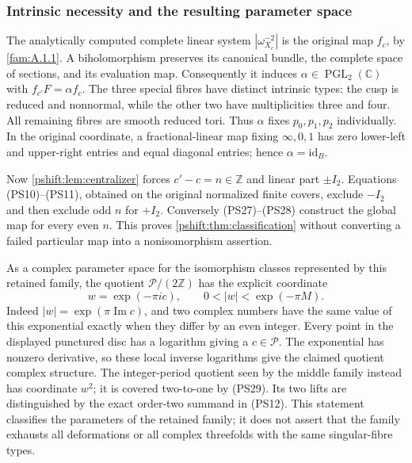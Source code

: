 \subsubsection{Intrinsic necessity and the resulting parameter space}

The analytically computed complete linear system
$|\omega_{X_c}^{-2}|$ is the original map $f_c$, by
\cref{fam:A.1.1}. A biholomorphism preserves its
canonical bundle, the complete space of sections, and its evaluation
map. Consequently it induces $\alpha\in\operatorname{PGL}_2(\mathbb C)$
with $f_{c'}F=\alpha f_c$. The three special fibres have distinct
intrinsic types: the cusp is reduced and nonnormal, while the other
two have multiplicities three and four. All remaining fibres are
smooth reduced tori. Thus $\alpha$ fixes $p_0,p_1,p_2$ individually.
In the original coordinate, a fractional-linear map fixing
$\infty,0,1$ has zero lower-left and upper-right entries and equal
diagonal entries; hence $\alpha=\mathrm{id}_B$.

Now \cref{pshift:lem:centralizer} forces $c'-c=n\in\mathbb Z$
and linear part $\pm I_2$. Equations (PS10)--(PS11), obtained on
the original normalized finite covers, exclude $-I_2$ and then
exclude odd $n$ for $+I_2$. Conversely (PS27)--(PS28) construct
the global map for every even $n$. This proves
\cref{pshift:thm:classification} without converting a failed
particular map into a nonisomorphism assertion.

As a complex parameter space for the isomorphism classes represented
by this retained family, the quotient $\mathcal P/(2\mathbb Z)$ has
the explicit coordinate
\[
 w=\exp(-\pi ic),\qquad 0<|w|<\exp(-\pi M).
 \tag{PS29}\label{pshift:eq:parameter-disc}
\]
Indeed $|w|=\exp(\pi\operatorname{Im}c)$, and two complex numbers
have the same value of this exponential exactly when they differ
by an even integer. Every point in the displayed punctured disc
has a logarithm giving a $c\in\mathcal P$. The exponential has
nonzero derivative, so these local inverse logarithms give the
claimed quotient complex structure. The integer-period quotient
seen by the middle family instead has coordinate $w^2$; it is
covered two-to-one by (PS29). Its two lifts are distinguished by
the exact order-two summand in (PS12). This statement classifies
the parameters of the retained family; it does not assert that
the family exhausts all deformations or all complex threefolds
with the same singular-fibre types.
